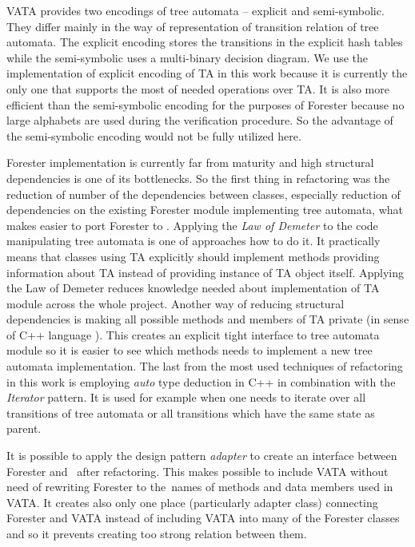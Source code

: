 \documentclass[fleqn,11pt]{ExcelAtFIT} %
\begin{document}
VATA provides two encodings of tree automata -- explicit and semi-symbolic.
They differ mainly in the way of representation of transition relation of tree automata.
The explicit encoding stores the transitions in the explicit hash tables while the semi-symbolic
uses a multi-binary decision diagram.
We use the implementation of explicit encoding of TA in this work because
it is currently the only one that supports the most of needed operations over TA.
It is also more efficient than the semi-symbolic encoding for the purposes of Forester because no large alphabets are used during the verification procedure.
So the advantage of the semi-symbolic encoding would not be fully utilized here.

Forester implementation is currently far from maturity and
high structural dependencies is one of its bottlenecks.
So the first thing in refactoring was the reduction of number of the dependencies between classes,
especially reduction of dependencies on the existing Forester module implementing tree automata,
what makes easier to port Forester to \vata.
Applying the \emph{Law of Demeter} \cite{lod89} to the code manipulating tree automata is one of approaches how to do it. 
It practically means that classes using TA explicitly should implement methods providing information about TA instead of providing instance of TA object itself.
Applying the Law of Demeter reduces knowledge needed about implementation of TA module across the whole project.
Another way of reducing structural dependencies is making all possible methods and members of TA private (in sense of C++ language \cite{stroustrup13}).
This creates an explicit tight interface to tree automata module so it is easier to see which methods needs to implement
a new tree automata implementation.
The last from the most used techniques of refactoring in this work is employing \emph{auto} type deduction in C++ in combination
with the \emph{Iterator} pattern.
It is used for example when one needs to iterate over all transitions of tree automata or all transitions which
have the same state as parent.

It is possible to apply the design pattern \emph{adapter} \cite{gamma95} to create
an interface between Forester and \vata\ after refactoring.
This makes possible to include VATA without need of rewriting
Forester to the~names of methods and data members used in VATA.
It creates also only one place (particularly adapter class) connecting Forester and VATA instead of
including VATA into many of the Forester classes and so it prevents creating too strong relation between them.
\end{document}
